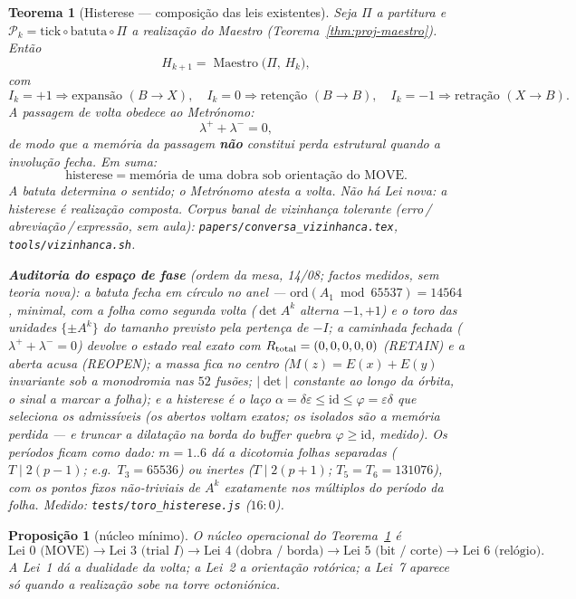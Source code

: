 \documentclass[11pt,a4paper]{article}
\newtheorem{teorema}{Teorema}
\newtheorem{proposicao}{Proposição}
\newcommand{\code}[1]{\texttt{#1}}
\begin{document}
\begin{teorema}[Histerese --- composição das leis existentes]\label{thm:histerese}
Seja $\Pi$ a partitura e $\mathcal{P}_k=\mathrm{tick}\circ\mathrm{batuta}\circ\Pi$
a realização do Maestro (Teorema~\ref{thm:proj-maestro}). Então
\[
\boxed{
H_{k+1}
=
\operatorname{Maestro}\bigl(\Pi,\,H_k\bigr),
}
\]
com
\[
\boxed{
I_k=+1 \Rightarrow \text{expansão }(B\to X),\quad
I_k=0 \Rightarrow \text{retenção }(B\to B),\quad
I_k=-1 \Rightarrow \text{retração }(X\to B).
}
\]
A passagem de volta obedece ao Metrónomo:
\[
\boxed{\lambda^{+} + \lambda^{-} = 0},
\]
de modo que a memória da passagem \textbf{não} constitui perda
estrutural quando a involução fecha. Em suma:
\[
\boxed{
\text{histerese}
=
\text{memória de uma dobra sob orientação do MOVE}.
}
\]
A batuta determina o sentido; o Metrónomo atesta a volta.
\emph{Não há Lei nova:} a histerese é realização composta.
Corpus banal de vizinhança tolerante (erro\,/\,abreviação\,/\,expressão,
sem aula): \code{papers/conversa\_vizinhanca.tex},
\code{tools/vizinhanca.sh}.

\medskip
\noindent\textbf{Auditoria do espaço de fase} (ordem da mesa, 14/08;
factos medidos, sem teoria nova): a batuta fecha em círculo no anel ---
$\mathrm{ord}(A_1 \bmod 65537)=14564$, minimal, com a \emph{folha} como
segunda volta ($\det A^{k}$ alterna $-1,+1$) e o toro das unidades
$\{\pm A^{k}\}$ do tamanho previsto pela pertença de $-I$; a caminhada
\emph{fechada} ($\lambda^{+}{+}\lambda^{-}=0$) devolve o estado real
exato com $R_{\rm total}=(0,0,0,0,0)$ (RETAIN) e a aberta acusa
(REOPEN); a massa fica no \emph{centro} ($M(z)=E(x){+}E(y)$ invariante
sob a monodromia nas $52$ fusões; $|\det|$ constante ao longo da
órbita, o sinal a marcar a folha); e a histerese é o laço
$\alpha=\delta\varepsilon\leq\mathrm{id}\leq\varphi=\varepsilon\delta$
que \emph{seleciona} os admissíveis (os abertos voltam exatos; os
isolados são a memória perdida --- e truncar a dilatação na borda do
buffer quebra $\varphi\geq\mathrm{id}$, medido). Os períodos ficam como
\emph{dado}: $m=1..6$ dá a dicotomia folhas separadas
($T\mid 2(p{-}1)$; e.g.\ $T_3=65536$) ou inertes ($T\mid 2(p{+}1)$;
$T_5=T_6=131076$), com os pontos fixos não-triviais de $A^{k}$
exatamente nos múltiplos do período da folha.
\emph{Medido:} \code{tests/toro\_histerese.js} ($16{:}0$).
\end{teorema}

\begin{proposicao}[núcleo mínimo]\label{prop:histerese-nucleo}
O núcleo operacional do Teorema~\ref{thm:histerese} é
\[
\boxed{
\text{Lei~0 (MOVE)}
\to
\text{Lei~3 (trial }I\text{)}
\to
\text{Lei~4 (dobra / borda)}
\to
\text{Lei~5 (bit / corte)}
\to
\text{Lei~6 (relógio)}.
}
\]
A Lei~1 dá a dualidade da volta; a Lei~2 a orientação rotórica; a
Lei~7 aparece só quando a realização sobe na torre octoniónica.
\end{proposicao}
\end{document}
